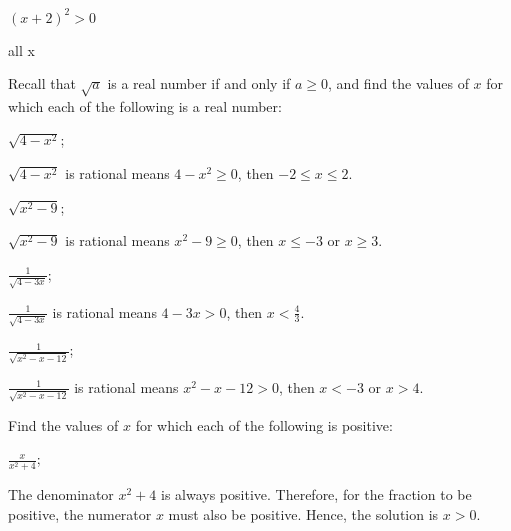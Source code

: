 \begin{questions}
\begin{solution}
\begin{tasks}
{\begin{note}
        $ (x+2)^2 > 0 $

      \end{note}
      all x
      }
    \end{tasks}
  \end{solution}
  \item Recall that $\sqrt{a}$ is a real number if and only if $a \geq 0$, and find the values of $x$ for which each of the following is a real number:
  \begin{tasks}
    \task $\sqrt{4-x^2}$;

    \begin{solution}
      $\sqrt{4-x^2}$ is rational means $4-x^2 \geq 0$, then $-2 \leq x \leq 2$.
    \end{solution}

    \task $\sqrt{x^2-9}$;

    \begin{solution}
      $\sqrt{x^2-9}$ is rational means $x^2-9 \geq 0$, then $x \leq -3$ or $x \geq 3$.
    \end{solution}

    \task \(\frac{1}{\sqrt{4-3x}}\);

    \begin{solution}
      \(\frac{1}{\sqrt{4-3x}}\) is rational means $4-3x>0$, then \(x < \frac{4}{3}\).
    \end{solution}

    \task \(\frac{1}{\sqrt{x^2-x-12}}\);

    \begin{solution}
      \(\frac{1}{\sqrt{x^2-x-12}}\) is rational means $x^2-x-12>0$, then $x<-3$ or $x>4$.
    \end{solution}

  \end{tasks}

  \item Find the values of $x$ for which each of the following is positive:
  \begin{tasks}
    \task \(\frac{x}{x^2+4}\);

    \begin{solution}
      The denominator $x^2+4$ is always positive. Therefore, for the fraction to be positive, the numerator $x$ must also be positive. Hence, the solution is $x>0$.
    \end{solution}


\end{tasks}
\end{questions}
